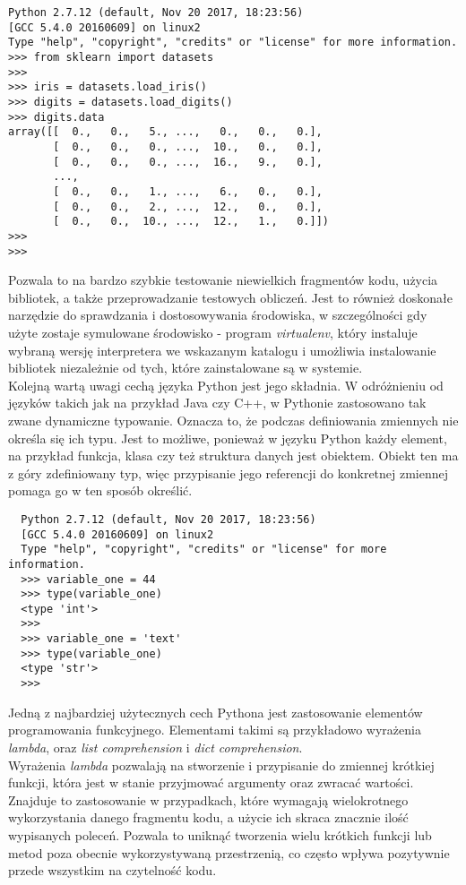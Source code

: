 \begin{lstlisting}
Python 2.7.12 (default, Nov 20 2017, 18:23:56) 
[GCC 5.4.0 20160609] on linux2
Type "help", "copyright", "credits" or "license" for more information. 
>>> from sklearn import datasets
>>> 
>>> iris = datasets.load_iris()
>>> digits = datasets.load_digits()
>>> digits.data
array([[  0.,   0.,   5., ...,   0.,   0.,   0.],
       [  0.,   0.,   0., ...,  10.,   0.,   0.],
       [  0.,   0.,   0., ...,  16.,   9.,   0.],
       ..., 
       [  0.,   0.,   1., ...,   6.,   0.,   0.],
       [  0.,   0.,   2., ...,  12.,   0.,   0.],
       [  0.,   0.,  10., ...,  12.,   1.,   0.]])
>>>
>>>
\end{lstlisting}

Pozwala to na bardzo szybkie testowanie niewielkich fragmentów kodu, użycia bibliotek, a także przeprowadzanie testowych obliczeń.
Jest to również doskonałe narzędzie do sprawdzania i dostosowywania środowiska, w szczególności gdy użyte zostaje symulowane środowisko - program \textit{virtualenv}, 
który instaluje wybraną wersję interpretera we wskazanym katalogu i umożliwia instalowanie bibliotek niezależnie od tych, które zainstalowane są w systemie.\\

Kolejną wartą uwagi cechą języka Python jest jego składnia. W odróżnieniu od języków takich jak na przykład Java czy C++, w Pythonie zastosowano tak zwane dynamiczne typowanie.
Oznacza to, że podczas definiowania zmiennych nie określa się ich typu. Jest to możliwe, ponieważ w języku Python każdy element, na przykład funkcja, klasa czy też struktura danych jest obiektem.
Obiekt ten ma z góry zdefiniowany typ, więc przypisanie jego referencji do konkretnej zmiennej pomaga go w ten sposób określić.
\begin{lstlisting}
  Python 2.7.12 (default, Nov 20 2017, 18:23:56) 
  [GCC 5.4.0 20160609] on linux2
  Type "help", "copyright", "credits" or "license" for more information.
  >>> variable_one = 44
  >>> type(variable_one)
  <type 'int'>
  >>> 
  >>> variable_one = 'text'
  >>> type(variable_one)
  <type 'str'>
  >>> 
\end{lstlisting}

Jedną z najbardziej użytecznych cech Pythona jest zastosowanie elementów programowania funkcyjnego. Elementami takimi są przykładowo wyrażenia \textit{lambda}, oraz \textit{list comprehension} i \textit{dict comprehension}.\\

Wyrażenia \textit{lambda} pozwalają na stworzenie i przypisanie do zmiennej krótkiej funkcji, która jest w stanie przyjmować argumenty oraz zwracać wartości.
Znajduje to zastosowanie w przypadkach, które wymagają wielokrotnego wykorzystania danego fragmentu kodu, a użycie ich skraca znacznie ilość wypisanych poleceń.
Pozwala to uniknąć tworzenia wielu krótkich funkcji lub metod poza obecnie wykorzystywaną przestrzenią, co często wpływa pozytywnie przede wszystkim na czytelność kodu.\\

